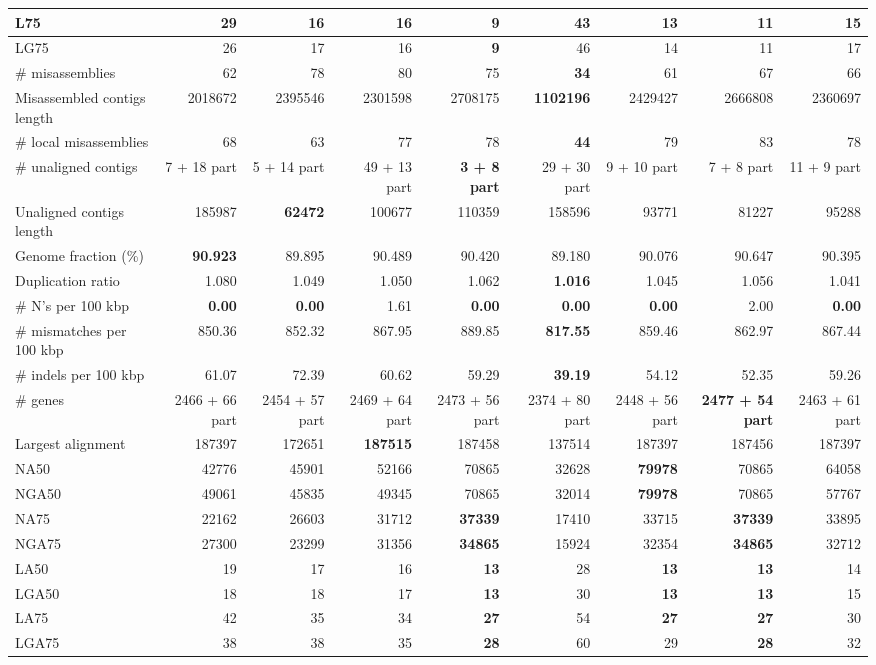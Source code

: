 \documentclass[12pt,a4paper]{article}
\begin{document}
\begin{table}[ht]
\begin{center}
\begin{tabular}{|l*{8}{|r}|}
L75 & 29 & 16 & 16 & {\bf 9} & 43 & 13 & 11 & 15 \\ \hline
LG75 & 26 & 17 & 16 & {\bf 9} & 46 & 14 & 11 & 17 \\ \hline
\# misassemblies & 62 & 78 & 80 & 75 & {\bf 34} & 61 & 67 & 66 \\ \hline
Misassembled contigs length & 2018672 & 2395546 & 2301598 & 2708175 & {\bf 1102196} & 2429427 & 2666808 & 2360697 \\ \hline
\# local misassemblies & 68 & 63 & 77 & 78 & {\bf 44} & 79 & 83 & 78 \\ \hline
\# unaligned contigs & 7 + 18 part & 5 + 14 part & 49 + 13 part & {\bf 3 + 8 part} & 29 + 30 part & 9 + 10 part & 7 + 8 part & 11 + 9 part \\ \hline
Unaligned contigs length & 185987 & {\bf 62472} & 100677 & 110359 & 158596 & 93771 & 81227 & 95288 \\ \hline
Genome fraction (\%) & {\bf 90.923} & 89.895 & 90.489 & 90.420 & 89.180 & 90.076 & 90.647 & 90.395 \\ \hline
Duplication ratio & 1.080 & 1.049 & 1.050 & 1.062 & {\bf 1.016} & 1.045 & 1.056 & 1.041 \\ \hline
\# N's per 100 kbp & {\bf 0.00} & {\bf 0.00} & 1.61 & {\bf 0.00} & {\bf 0.00} & {\bf 0.00} & 2.00 & {\bf 0.00} \\ \hline
\# mismatches per 100 kbp & 850.36 & 852.32 & 867.95 & 889.85 & {\bf 817.55} & 859.46 & 862.97 & 867.44 \\ \hline
\# indels per 100 kbp & 61.07 & 72.39 & 60.62 & 59.29 & {\bf 39.19} & 54.12 & 52.35 & 59.26 \\ \hline
\# genes & 2466 + 66 part & 2454 + 57 part & 2469 + 64 part & 2473 + 56 part & 2374 + 80 part & 2448 + 56 part & {\bf 2477 + 54 part} & 2463 + 61 part \\ \hline
Largest alignment & 187397 & 172651 & {\bf 187515} & 187458 & 137514 & 187397 & 187456 & 187397 \\ \hline
NA50 & 42776 & 45901 & 52166 & 70865 & 32628 & {\bf 79978} & 70865 & 64058 \\ \hline
NGA50 & 49061 & 45835 & 49345 & 70865 & 32014 & {\bf 79978} & 70865 & 57767 \\ \hline
NA75 & 22162 & 26603 & 31712 & {\bf 37339} & 17410 & 33715 & {\bf 37339} & 33895 \\ \hline
NGA75 & 27300 & 23299 & 31356 & {\bf 34865} & 15924 & 32354 & {\bf 34865} & 32712 \\ \hline
LA50 & 19 & 17 & 16 & {\bf 13} & 28 & {\bf 13} & {\bf 13} & 14 \\ \hline
LGA50 & 18 & 18 & 17 & {\bf 13} & 30 & {\bf 13} & {\bf 13} & 15 \\ \hline
LA75 & 42 & 35 & 34 & {\bf 27} & 54 & {\bf 27} & {\bf 27} & 30 \\ \hline
LGA75 & 38 & 38 & 35 & {\bf 28} & 60 & 29 & {\bf 28} & 32 \\ \hline
\end{tabular}
\end{center}
\end{table}
\end{document}
